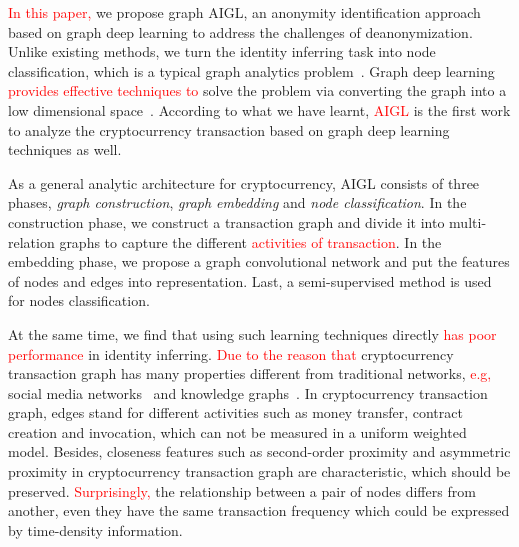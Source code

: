 \textcolor{red}{In this paper,} we propose graph AIGL, an anonymity identification approach based on graph deep learning to address the challenges of deanonymization. %
Unlike existing methods, we turn the identity inferring task into node classification, which is a typical graph analytics problem~\cite{cai2018comprehensive}. Graph deep learning \textcolor{red}{provides effective techniques to} solve the problem via converting the graph into a low dimensional space~\cite{hamilton2017representation,battaglia2018relational}. %
According to what we have learnt, \textcolor{red}{AIGL} is the first work to analyze the cryptocurrency transaction based on graph deep learning techniques as well.

As a general analytic architecture for cryptocurrency, AIGL consists of three phases, \emph{graph construction}, \emph{graph embedding} and \emph{node classification}. In the construction phase, we construct a transaction graph and divide it into multi-relation graphs to capture the different \textcolor{red}{activities of transaction}. In the embedding phase, we propose a graph convolutional network and put the features of nodes and edges into representation. Last, a semi-supervised method is used for nodes classification.

At the same time, we find that using such learning techniques directly \textcolor{red}{has poor performance} in identity inferring. \textcolor{red}{Due to the reason that} cryptocurrency transaction graph has many properties different from traditional networks, \textcolor{red}{e.g,} social media networks~\cite{geng2015learning} and knowledge graphs~\cite{bollacker2008freebase}. In cryptocurrency transaction graph, edges stand for different activities such as money transfer, contract creation and invocation, which can not be measured in a uniform weighted model. Besides, closeness features such as second-order proximity and asymmetric proximity in cryptocurrency transaction graph are characteristic, which should be preserved. \textcolor{red}{Surprisingly,} the relationship between a pair of nodes differs from another, even they have the same transaction frequency which could be expressed by time-density information.

